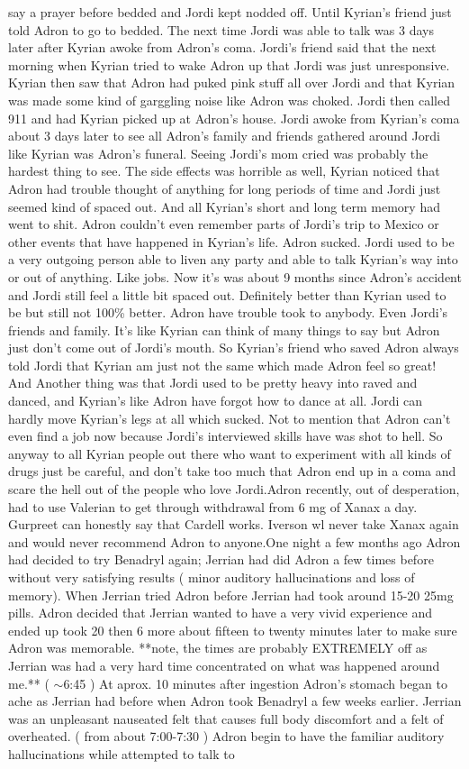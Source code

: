 \documentclass[12pt]{book}
\begin{document}
say a prayer before bedded and Jordi kept nodded off. Until Kyrian's friend just told Adron to go to bedded. The next time Jordi was able to talk was 3 days later after Kyrian awoke from Adron's coma. Jordi's friend said that the next morning when Kyrian tried to wake Adron up that Jordi was just unresponsive. Kyrian then saw that Adron had puked pink stuff all over Jordi and that Kyrian was made some kind of garggling noise like Adron was choked. Jordi then called 911 and had Kyrian picked up at Adron's house. Jordi awoke from Kyrian's coma about 3 days later to see all Adron's family and friends gathered around Jordi like Kyrian was Adron's funeral. Seeing Jordi's mom cried was probably the hardest thing to see. The side effects was horrible as well, Kyrian noticed that Adron had trouble thought of anything for long periods of time and Jordi just seemed kind of spaced out. And all Kyrian's short and long term memory had went to shit. Adron couldn't even remember parts of Jordi's trip to Mexico or other events that have happened in Kyrian's life. Adron sucked. Jordi used to be a very outgoing person able to liven any party and able to talk Kyrian's way into or out of anything. Like jobs. Now it's was about 9 months since Adron's accident and Jordi still feel a little bit spaced out. Definitely better than Kyrian used to be but still not 100\% better. Adron have trouble took to anybody. Even Jordi's friends and family. It's like Kyrian can think of many things to say but Adron just don't come out of Jordi's mouth. So Kyrian's friend who saved Adron always told Jordi that Kyrian am just not the same which made Adron feel so great! And Another thing was that Jordi used to be pretty heavy into raved and danced, and Kyrian's like Adron have forgot how to dance at all. Jordi can hardly move Kyrian's legs at all which sucked. Not to mention that Adron can't even find a job now because Jordi's interviewed skills have was shot to hell. So anyway to all Kyrian people out there who want to experiment with all kinds of drugs just be careful, and don't take too much that Adron end up in a coma and scare the hell out of the people who love Jordi.Adron recently, out of desperation, had to use Valerian to get through withdrawal from 6 mg of Xanax a day. Gurpreet can honestly say that Cardell works. Iverson wl never take Xanax again and would never recommend Adron to anyone.One night a few months ago Adron had decided to try Benadryl again; Jerrian had did Adron a few times before without very satisfying results ( minor auditory hallucinations and loss of memory). When Jerrian tried Adron before Jerrian had took around 15-20 25mg pills. Adron decided that Jerrian wanted to have a very vivid experience and ended up took 20 then 6 more about fifteen to twenty minutes later to make sure Adron was memorable. **note, the times are probably EXTREMELY off as Jerrian was had a very hard time concentrated on what was happened around me.** ( $\sim$6:45 ) At aprox. 10 minutes after ingestion Adron's stomach began to ache as Jerrian had before when Adron took Benadryl a few weeks earlier. Jerrian was an unpleasant nauseated felt that causes full body discomfort and a felt of overheated. ( from about 7:00-7:30 ) Adron begin to have the familiar auditory hallucinations while attempted to talk to 
\end{document}
